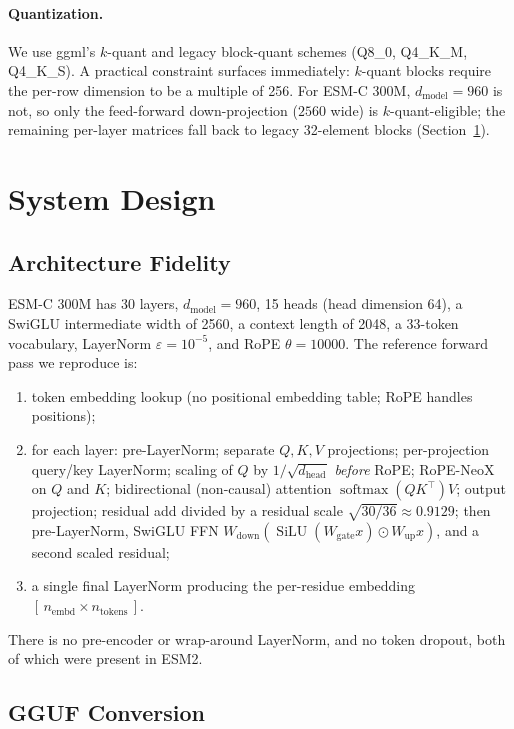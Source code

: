 \documentclass{article}
\begin{document}
\paragraph{Quantization.}
We use ggml's $k$-quant and legacy block-quant schemes (Q8\_0, Q4\_K\_M, Q4\_K\_S). A practical constraint surfaces immediately: $k$-quant blocks require the per-row dimension to be a multiple of 256. For ESM-C 300M, $d_{\text{model}}=960$ is not, so only the feed-forward down-projection ($2560$ wide) is $k$-quant-eligible; the remaining per-layer matrices fall back to legacy 32-element blocks (Section~\ref{sec:design}).

\section{System Design}
\label{sec:design}

\subsection{Architecture Fidelity}

ESM-C 300M has 30 layers, $d_{\text{model}}=960$, 15 heads (head dimension 64), a SwiGLU intermediate width of 2560, a context length of 2048, a 33-token vocabulary, LayerNorm $\varepsilon=10^{-5}$, and RoPE $\theta=10000$. The reference forward pass we reproduce is:
\begin{enumerate}
  \item token embedding lookup (no positional embedding table; RoPE handles positions);
  \item for each layer: pre-LayerNorm; separate $Q,K,V$ projections; per-projection query/key LayerNorm; scaling of $Q$ by $1/\sqrt{d_{\text{head}}}$ \emph{before} RoPE; RoPE-NeoX on $Q$ and $K$; bidirectional (non-causal) attention $\operatorname{softmax}(QK^\top)V$; output projection; residual add divided by a residual scale $\sqrt{30/36}\approx0.9129$; then pre-LayerNorm, SwiGLU FFN $W_{\text{down}}(\operatorname{SiLU}(W_{\text{gate}}x)\odot W_{\text{up}}x)$, and a second scaled residual;
  \item a single final LayerNorm producing the per-residue embedding $[\,n_{\text{embd}}\times n_{\text{tokens}}\,]$.
\end{enumerate}
There is no pre-encoder or wrap-around LayerNorm, and no token dropout, both of which were present in ESM2.

\subsection{GGUF Conversion}
\end{document}
